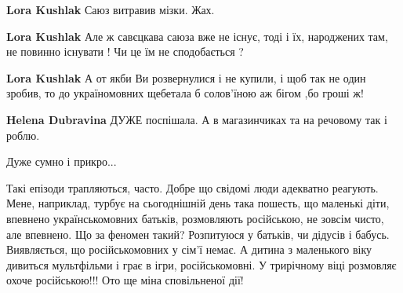 \begin{itemize}
\begin{itemize}
\textbf{Lora Kushlak} Саюз витравив мізки. Жах.

 
\textbf{Lora Kushlak} Але ж савєцкава саюза вже не існує, тоді і їх, народжених там, не повинно існувати ! Чи це їм не сподобається ?

 
\textbf{Lora Kushlak} А от якби Ви розвернулися і не купили, і щоб так не один зробив, то до україномовних щебетала б солов'їною аж бігом ,бо гроші ж!

 
\textbf{Helena Dubravina} ДУЖЕ поспішала. А в магазинчиках та на речовому так і роблю.
\end{itemize}

 
Дуже сумно і прикро...

 

Такі епізоди трапляються, часто. Добре що свідомі люди адекватно реагують. Мене,
наприклад, турбує на сьогоднішній день така пошесть, що маленькі діти, впевнено
українськомовних батьків, розмовляють російською, не зовсім чисто, але
впевнено. Що за феномен такий? Розпитуюся у батьків, чи дідусів і
бабусь. Виявляється, що російськомовних у сім'ї немає. А дитина з маленького віку
дивиться мультфільми і грає в ігри, російськомовні. У трирічному віці розмовляє
охоче російською!!! Ото ще міна сповільненої дії!


\end{itemize}
